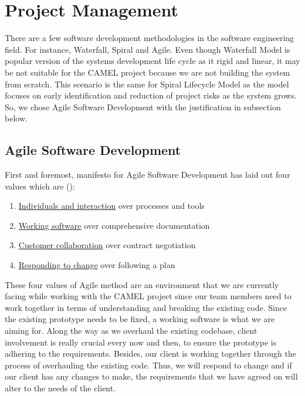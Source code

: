 \section{Project Management}
		There are a few software development methodologies in the software engineering field. For instance, Waterfall, Spiral and Agile. Even though Waterfall Model is popular version of the systems development life cycle as it rigid and linear, it may be not suitable for the CAMEL project because we are not building the system from scratch. This scenario is the same for Spiral Lifecycle Model as the model focuses on early identification and reduction of project risks as the system grows. So, we chose Agile Software Development with the justification in subsection below.
		
		\subsection*{Agile Software Development}
			First and foremost, manifesto for Agile Software Development has laid out four values which are (\cite{agileArtOfDevelopment}):
			
			\begin{enumerate}[i]
				\item \underline{Individuals and interaction} over processes and tools
				\item \underline{Working software} over comprehensive documentation
				\item \underline{Customer collaboration} over contract negotiation
				\item \underline{Responding to change} over following a plan
			\end{enumerate}
			
			These four values of Agile method are an environment that we are currently facing while working with the CAMEL project since our team members need to work together in terms of understanding and breaking the existing code. Since the existing prototype needs to be fixed, a working software is what we are aiming for. Along the way as we overhaul the existing codebase, client involvement is really crucial every now and then, to ensure the prototype is adhering to the requirements. Besides, our client is working together through the process of overhauling the existing code. Thus, we will respond to change and if our client has any changes to make, the requirements that we have agreed on will alter to the needs of the client.  
			
